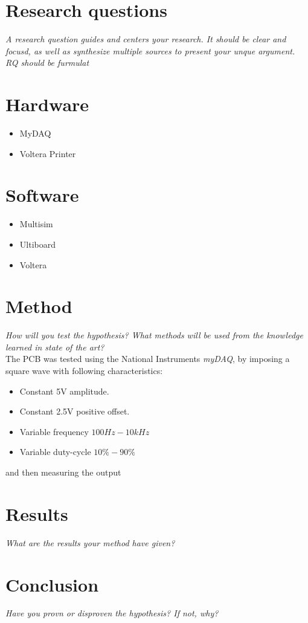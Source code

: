 \documentclass[conference]{IEEEtran}
\begin{document}
\section{Research questions}
\textit{A research question guides and centers your research. It should be clear and focusd, as well as synthesize multiple sources to present your unque argument. RQ should be furmulat}
\section{Hardware}
\begin{itemize}
        \item MyDAQ
        \item Voltera Printer
\end{itemize}
\section{Software}
\begin{itemize}
        \item Multisim
        \item Ultiboard
        \item Voltera
\end{itemize}
\section{Method}
\textit{How will you test the hypothesis? What methods will be used from the knowledge learned in state of the art?}
\\The PCB was tested using the National Instruments \textit{myDAQ}, by imposing a square wave with following characteristics:
\begin{itemize}
        \item Constant 5V amplitude.
        \item Constant 2.5V positive offset.
        \item Variable frequency $100Hz-10kHz$
        \item Variable duty-cycle $10\% - 90\%$
\end{itemize}
and then measuring the output
\section{Results}
\textit{What are the results your method have given?}

\section{Conclusion}
\textit{Have you provn or disproven the hypothesis? If not, why?}
\end{document}
